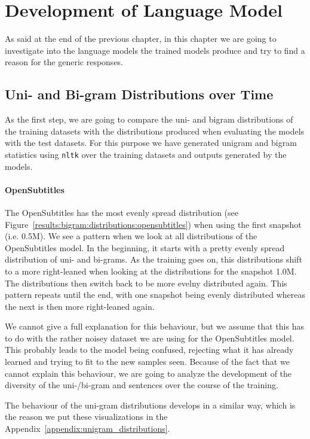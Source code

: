 \section{Development of Language Model}
\label{results:development_language_model}
As said at the end of the previous chapter, in this chapter we are going to investigate into the language models the trained models produce and try to find a reason for the generic responses.

\subsection{Uni- and Bi-gram Distributions over Time}
As the first step, we are going to compare the uni- and bigram distributions of the training datasets with the distributions produced when evaluating the models with the test datasets. For this purpose we have generated unigram and bigram statistics using \texttt{nltk} over the training datasets and outputs generated by the models.

\paragraph{OpenSubtitles} The OpenSubtitles has the most evenly spread distribution (see Figure~\ref{results:bigram:distributions:opensubtitles}) when using the first snapshot (i.e. 0.5M). We see a pattern when we look at all distributions of the OpenSubtitles model. In the beginning, it starts with a pretty evenly spread distribution of uni- and bi-grams. As the training goes on, this distributions shift to a more right-leaned when looking at the distributions for the snapshot 1.0M. The distributions then switch back to be more evelny distributed again. This pattern repeats until the end, with one snapshot being evenly distributed whereas the next is then more right-leaned again.

We cannot give a full explanation for this behaviour, but we assume that this has to do with the rather noisey dataset we are using for the OpenSubtitles model. This probably leads to the model being confused, rejecting what it has already learned and trying to fit to the new samples seen. Because of the fact that we cannot explain this behaviour, we are going to analyze the development of the diversity of the uni-/bi-gram and sentences over the course of the training.

The behaviour of the uni-gram distributions develops in a similar way, which is the reason we put these visualizations in the Appendix~\ref{appendix:unigram_distributions}.

